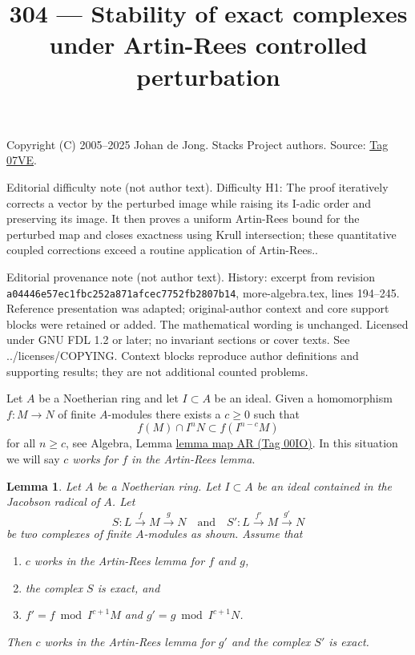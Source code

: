 \documentclass{amsart}
\theoremstyle{plain}
\newtheorem{lemma}[subsection]{Lemma}
\theoremstyle{definition}
\theoremstyle{remark}
\numberwithin{equation}{subsection}
\begin{document}
\title[Stacks Project, Tag 07VE]{304 --- Stability of exact complexes under Artin-Rees controlled perturbation}
\maketitle
\noindent Copyright (C) 2005--2025 Johan de Jong. Stacks Project authors. Source: \href{https://stacks.math.columbia.edu/tag/07VE}{Tag 07VE}.

\noindent Editorial difficulty note (not author text). Difficulty H1: The proof iteratively corrects a vector by the perturbed image while raising its I-adic order and preserving its image. It then proves a uniform Artin-Rees bound for the perturbed map and closes exactness using Krull intersection; these quantitative coupled corrections exceed a routine application of Artin-Rees..

\noindent Editorial provenance note (not author text). History: excerpt from revision \texttt{a0444\allowbreak 6e57e\allowbreak c1fbc\allowbreak 252a8\allowbreak 71afc\allowbreak ec775\allowbreak 2fb28\allowbreak 07b14}, more-algebra.tex, lines 194--245. Reference presentation was adapted; original-author context and core support blocks were retained or added. The mathematical wording is unchanged. Licensed under GNU FDL 1.2 or later; no invariant sections or cover texts. See ../licenses/COPYING. Context blocks reproduce author definitions and supporting results; they are not additional counted problems.

Let $A$ be a Noetherian ring and let $I \subset A$ be an ideal. Given a
homomorphism $f : M \to N$ of finite $A$-modules there exists a $c \geq 0$
such that
$$
f(M) \cap I^nN \subset f(I^{n - c}M)
$$
for all $n \geq c$, see Algebra, Lemma \href{https://stacks.math.columbia.edu/tag/00IO}{lemma map AR (Tag 00IO)}. In this
situation we will say {\it $c$ works for $f$ in the Artin-Rees lemma}.



\begin{lemma}
\label{lemma-approximate-complex}
Let $A$ be a Noetherian ring. Let $I \subset A$ be an ideal contained in
the Jacobson radical of $A$. Let
$$
S : L \xrightarrow{f} M \xrightarrow{g} N
\quad\text{and}\quad
S' : L \xrightarrow{f'} M \xrightarrow{g'} N
$$
be two complexes of finite $A$-modules as shown. Assume that
\begin{enumerate}
\item $c$ works in the Artin-Rees lemma for $f$ and $g$,
\item the complex $S$ is exact, and
\item $f' = f \bmod I^{c + 1}M$ and $g' = g \bmod I^{c + 1}N$.
\end{enumerate}
Then $c$ works in the Artin-Rees lemma for $g'$ and the
complex $S'$ is exact.
\end{lemma}
\end{document}
